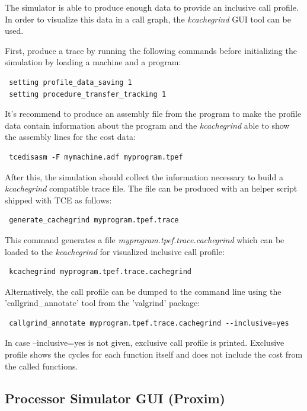\documentclass[twoside]{tceusermanual}
\begin{document}
The simulator is able to produce enough data to provide an inclusive call 
profile. In order to visualize this data in a call graph, the \textit{kcachegrind}
GUI tool can be used.

First, produce a trace by running the following commands
before initializing the simulation by loading a machine and a program:

\begin{verbatim}
 setting profile_data_saving 1
 setting procedure_transfer_tracking 1
\end{verbatim}

It's recommend to produce an assembly file from the program to make the
profile data contain information about the program and the 
\textit{kcachegrind} able to show the assembly lines for the cost data:

\begin{verbatim}
 tcedisasm -F mymachine.adf myprogram.tpef
\end{verbatim}

After this, the simulation should collect the information necessary to build
a \textit{kcachegrind} compatible trace file. The file can be produced with an
helper script shipped with TCE as follows:

\begin{verbatim}
 generate_cachegrind myprogram.tpef.trace
\end{verbatim}

This command generates a file \textit{myprogram.tpef.trace.cachegrind} which 
can be loaded to the \textit{kcachegrind} for visualized inclusive call
profile:

\begin{verbatim}
 kcachegrind myprogram.tpef.trace.cachegrind
\end{verbatim}

Alternatively, the call profile can be dumped to the command line using
the 'callgrind\_annotate' tool from the 'valgrind' package:

\begin{verbatim}
 callgrind_annotate myprogram.tpef.trace.cachegrind --inclusive=yes
\end{verbatim}

In case --inclusive=yes is not given, exclusive call profile is printed.
Exclusive profile shows the cycles for each function itself and does not
include the cost from the called functions.


\subsection{Processor Simulator GUI (Proxim)}
\label{section:proxim}
\end{document}
